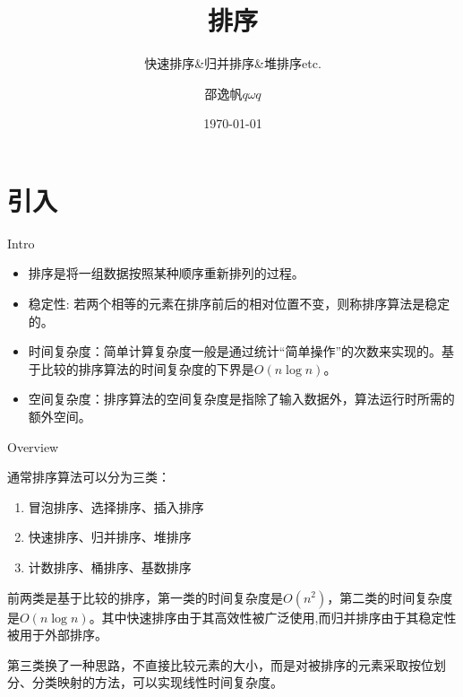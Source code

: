 \documentclass{ldr-simple-gray}
\title{排序}
\subtitle{快速排序\&归并排序\&堆排序etc.}
\author{邵逸帆$q\omega q$}
\institute[] {
  23电信基地班\\
  兰州大学算法与程序设计集训队
}
\date{\today}
\begin{document}
  \frame{\titlepage}

  \section{引入}
  \begin{frame}{Intro}
    \begin{itemize}
      \item 排序是将一组数据按照某种顺序重新排列的过程。
      \item 稳定性: 若两个相等的元素在排序前后的相对位置不变，则称排序算法是稳定的。
      \item 时间复杂度：简单计算复杂度一般是通过统计“简单操作”的次数来实现的。基于比较的排序算法的时间复杂度的下界是$O(n\log n)$。
      \item 空间复杂度：排序算法的空间复杂度是指除了输入数据外，算法运行时所需的额外空间。
    \end{itemize}
  \end{frame}

  \begin{frame}{Overview}
    \begin{block}{通常排序算法可以分为三类：}
      \begin{enumerate}
        \item 冒泡排序、选择排序、插入排序
        \item 快速排序、归并排序、堆排序
        \item 计数排序、桶排序、基数排序
      \end{enumerate}
    \end{block}

    前两类是基于比较的排序，第一类的时间复杂度是$O(n^2)$，第二类的时间复杂度是$O(n\log n)$。其中快速排序由于其高效性被广泛使用,而归并排序由于其稳定性被用于外部排序。\newline

    第三类换了一种思路，不直接比较元素的大小，而是对被排序的元素采取按位划分、分类映射的方法，可以实现线性时间复杂度。\newline
  \end{frame}
\end{document}
